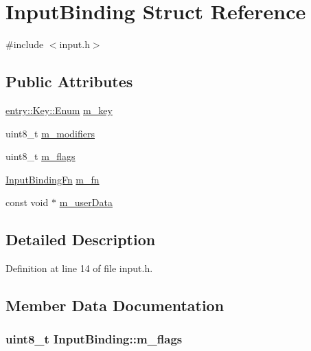 \hypertarget{struct_input_binding}{\section{Input\+Binding Struct Reference}
\label{struct_input_binding}
}


{\ttfamily \#include $<$input.\+h$>$}

\subsection*{Public Attributes}
\begin{DoxyCompactItemize}
\item 
\hyperlink{structentry_1_1_key_a2c04c2d92f79b961243e4244603ca633}{entry\+::\+Key\+::\+Enum} \hyperlink{struct_input_binding_af3b1d9074e72dc711caa33ea5bb964d1}{m\+\_\+key}
\item 
uint8\+\_\+t \hyperlink{struct_input_binding_a15a1fd933f0304996536b7979d3c3fab}{m\+\_\+modifiers}
\item 
uint8\+\_\+t \hyperlink{struct_input_binding_acde39861735291096f54a07d2a1d16d9}{m\+\_\+flags}
\item 
\hyperlink{input_8h_a53c371a6cdc3ef9cb2852842a395f051}{Input\+Binding\+Fn} \hyperlink{struct_input_binding_af6ba3f6ea52ac588cc30d28328cc004e}{m\+\_\+fn}
\item 
const void $\ast$ \hyperlink{struct_input_binding_acdadb3240faeaa025822321b2ea56b6e}{m\+\_\+user\+Data}
\end{DoxyCompactItemize}


\subsection{Detailed Description}


Definition at line 14 of file input.\+h.



\subsection{Member Data Documentation}
\hypertarget{struct_input_binding_acde39861735291096f54a07d2a1d16d9}{
\subsubsection[{m\+\_\+flags}]{\setlength{\rightskip}{0pt plus 5cm}uint8\+\_\+t Input\+Binding\+::m\+\_\+flags}}\label{struct_input_binding_acde39861735291096f54a07d2a1d16d9}


